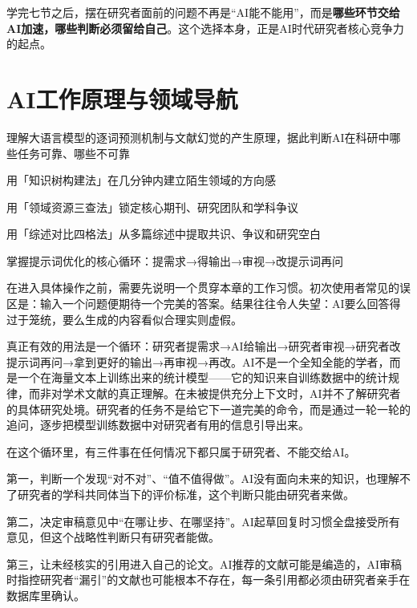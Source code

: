 \medskip
学完七节之后，摆在研究者面前的问题不再是``AI能不能用''，而是\textbf{哪些环节交给AI加速，哪些判断必须留给自己}。这个选择本身，正是AI时代研究者核心竞争力的起点。
\newpage

\section{AI工作原理与领域导航}
\label{sec:5.1}

\begin{sectionkeypoints}
\item 理解大语言模型的逐词预测机制与文献幻觉的产生原理，据此判断AI在科研中哪些任务可靠、哪些不可靠
\item 用「知识树构建法」在几分钟内建立陌生领域的方向感
\item 用「领域资源三查法」锁定核心期刊、研究团队和学科争议
\item 用「综述对比四格法」从多篇综述中提取共识、争议和研究空白
\item 掌握提示词优化的核心循环：提需求→得输出→审视→改提示词再问
\end{sectionkeypoints}

在进入具体操作之前，需要先说明一个贯穿本章的工作习惯。初次使用者常见的误区是：输入一个问题便期待一个完美的答案。结果往往令人失望：AI要么回答得过于笼统，要么生成的内容看似合理实则虚假。

真正有效的用法是一个循环：研究者提需求→AI给输出→研究者审视→研究者改提示词再问→拿到更好的输出→再审视→再改。AI不是一个全知全能的学者，而是一个在海量文本上训练出来的统计模型——它的知识来自训练数据中的统计规律，而非对学术文献的真正理解。在未被提供充分上下文时，AI并不了解研究者的具体研究处境。研究者的任务不是给它下一道完美的命令，而是通过一轮一轮的追问，逐步把模型训练数据中对研究者有用的信息引导出来。

在这个循环里，有三件事在任何情况下都只属于研究者、不能交给AI。

第一，判断一个发现``对不对''、``值不值得做''。AI没有面向未来的知识，也理解不了研究者的学科共同体当下的评价标准，这个判断只能由研究者来做。

第二，决定审稿意见中``在哪让步、在哪坚持''。AI起草回复时习惯全盘接受所有意见，但这个战略性判断只有研究者能做。

第三，让未经核实的引用进入自己的论文。AI推荐的文献可能是编造的，AI审稿时指控研究者``漏引''的文献也可能根本不存在，每一条引用都必须由研究者亲手在数据库里确认。

